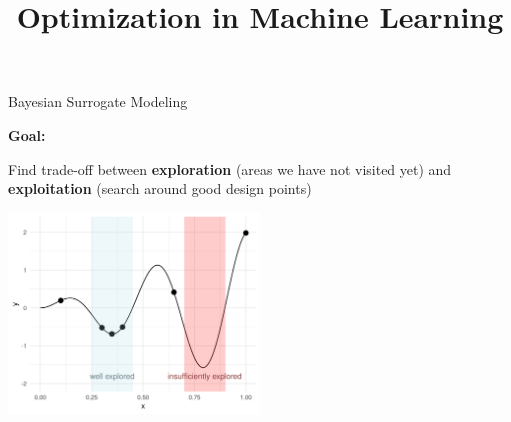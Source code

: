 \documentclass[11pt,compress,t,notes=noshow, xcolor=table]{beamer}
\title{Optimization in Machine Learning}
\begin{document}

\begin{vbframe}{Bayesian Surrogate Modeling}

\textbf{Goal:}

Find trade-off between \textbf{exploration} (areas we have not visited yet) and \textbf{exploitation} (search around good design points)

\vspace{+.45cm}

\begin{center}
  \includegraphics[width = 0.5\textwidth]{figure_man/bayesian_loop_ee.png}
\end{center}

\framebreak 


\end{vbframe}
\end{document}
